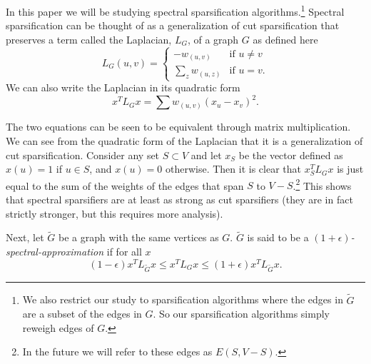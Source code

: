 \documentclass[12pt,twoside]{article}
\begin{document}
In this paper we will be studying spectral sparsification algorithms.\footnote{We also restrict our study to sparsification algorithms where the edges in $\tilde{G}$ are a subset of the edges in $G$. So our sparsification algorithms simply reweigh edges of $G$.} Spectral sparsification can be thought of as a generalization of cut sparsification that preserves a term called the Laplacian, $L_G$, of a graph $G$ as defined here
%
\begin{equation}
\label{eqn:laplacian-matrix-def}
L_G(u,v) = 
            \begin{cases} 
                -w_{(u,v)}           &\mbox{if } u \not= v \\
                \sum_z w_{(u,z)}     &\mbox{if } u = v. 
            \end{cases}
\end{equation}
%
We can also write the Laplacian in its quadratic form
%
\begin{equation}
\label{eqn:laplacian-vertex-def}
x^T L_G x = \sum w_{(u,v)} (x_u-x_v)^2.
\end{equation}

The two equations can be seen to be equivalent through matrix multiplication. We can see from the quadratic form of the Laplacian that it is a generalization of cut sparsification. Consider any set $S \subset V$ and let $x_S$ be the vector defined as $x(u) = 1$ if $u \in S$, and $x(u) = 0$ otherwise. Then it is clear that $x_S^T L_G x$ is just equal to the sum of the weights of the edges that span $S$ to $V - S$.\footnote{In the future we will refer to these edges as $E(S, V-S)$.} This shows that spectral sparsifiers are at least as strong as cut sparsifiers (they are in fact strictly stronger, but this requires more analysis). 
 
Next, let $\tilde{G}$ be a graph with the same vertices as $G$. $\tilde{G}$ is said to be a \emph{$(1+\epsilon)$-spectral-approximation} if for all $x$
%
\begin{equation}
\label{eqn:spectral-sparsifier-def}
(1-\epsilon) x^T L_{\tilde{G}} x \leq x^T L_G x \leq (1+\epsilon) x^T L_{\tilde{G}} x.
\end{equation}

\end{document}
